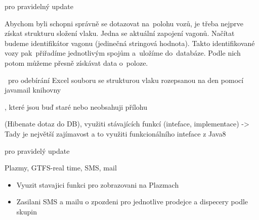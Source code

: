  pro pravidelný update


Abychom byli schopni správně se dotazovat na~polohu vozů, je třeba nejprve získat strukturu složení vlaku. Jedna se aktuální zapojení vagonů. Načítat budeme identifikátor vagonu (jedinečná stringová hodnota). Takto identifikované vozy pak~přiřadíme jednotlivým spojům a~uložíme do~databáze. Podle nich potom můžeme přesně získávat data o~poloze.

	
	
	
	
	
	
~pro odebírání Excel souboru se strukturou vlaku rozepsanou na den
 pomocí javamail knihovny
	
	
, které jsou buď staré nebo neobsahuji přílohu
	
	
	
 (Hibenate dotaz do DB), využiti stávajících funkcí
 (inteface, implementace) -> Tady je největší zajímavost a to využiti funkcionálního inteface z Java8
	
	
 pro pravidelý update
	
	

Plazmy, GTFS-real time, SMS, mail

\begin{itemize}
	\item Vyuzit stavajici funkci pro zobrazovani na Plazmach
	\item Zasilani SMS a mailu o zpozdeni pro jednotlive prodejce a dispecery podle skupin
\end{itemize}

